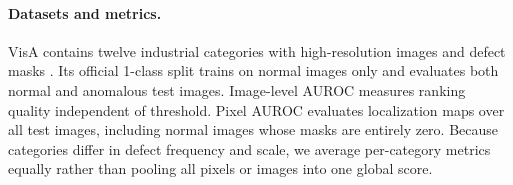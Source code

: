 \paragraph{Datasets and metrics.}
VisA contains twelve industrial categories with high-resolution images and
defect masks \cite{zou2022spotdiff}. Its official 1-class split trains on
normal images only and evaluates both normal and anomalous test images.
Image-level AUROC measures ranking quality independent of threshold. Pixel
AUROC evaluates localization maps over all test images, including normal
images whose masks are entirely zero. Because categories differ in defect
frequency and scale, we average per-category metrics equally rather than
pooling all pixels or images into one global score.
